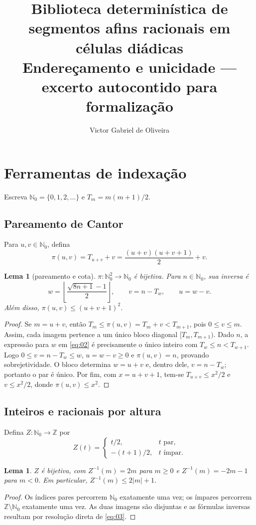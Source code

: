 \documentclass[11pt,a4paper]{article}
\title{Biblioteca determinística de segmentos afins racionais em células diádicas\\
Endereçamento e unicidade — excerto autocontido para formalização}
\author{Victor Gabriel de Oliveira}
\date{}
\theoremstyle{preciso}
\newtheorem{lema}[teorema]{Lema}
\theoremstyle{definition}
\newcommand{\N}{\mathbb N}
\newcommand{\Z}{\mathbb Z}
\newcommand{\eqn}[2]{\begin{equation}\label{eq:#1}#2\end{equation}}
\begin{document}
\maketitle
\setcounter{section}{1}

\section{Ferramentas de indexação}
Escreva $\N_0=\{0,1,2,\ldots\}$ e $T_m=m(m+1)/2$.

\subsection{Pareamento de Cantor}
Para $u,v\in\N_0$, defina
\eqn{01}{\pi(u,v)=T_{u+v}+v=\frac{(u+v)(u+v+1)}2+v.}
\begin{lema}[pareamento e cota]
$\pi:\N_0^2\to\N_0$ é bijetiva. Para $n\in\N_0$, sua inversa é
\eqn{02}{w=\left\lfloor\frac{\sqrt{8n+1}-1}{2}\right\rfloor,\qquad v=n-T_w,\qquad u=w-v.}
Além disso, $\pi(u,v)\le(u+v+1)^2$.
\end{lema}
\begin{proof}
Se $m=u+v$, então $T_m\le\pi(u,v)=T_m+v<T_{m+1}$, pois $0\le v\le m$. Assim, cada imagem pertence a um único bloco diagonal $[T_m,T_{m+1})$. Dado $n$, a expressão para $w$ em \eqref{eq:02} é precisamente o único inteiro com $T_w\le n<T_{w+1}$. Logo $0\le v=n-T_w\le w$, $u=w-v\ge0$ e $\pi(u,v)=n$, provando sobrejetividade. O bloco determina $w=u+v$ e, dentro dele, $v=n-T_w$; portanto o par é único. Por fim, com $x=u+v+1$, tem-se $T_{u+v}\le x^2/2$ e $v\le x^2/2$, donde $\pi(u,v)\le x^2$.
\end{proof}

\subsection{Inteiros e racionais por altura}
Defina $Z:\N_0\to\Z$ por
\eqn{03}{Z(t)=\begin{cases}t/2,&t\text{ par},\\-(t+1)/2,&t\text{ ímpar}.\end{cases}}
\begin{lema}
$Z$ é bijetiva, com $Z^{-1}(m)=2m$ para $m\ge0$ e $Z^{-1}(m)=-2m-1$ para $m<0$. Em particular, $Z^{-1}(m)\le2|m|+1$.
\end{lema}
\begin{proof}
Os índices pares percorrem $\N_0$ exatamente uma vez; os ímpares percorrem $\Z\setminus\N_0$ exatamente uma vez. As duas imagens são disjuntas e as fórmulas inversas resultam por resolução direta de \eqref{eq:03}.
\end{proof}
\end{document}
